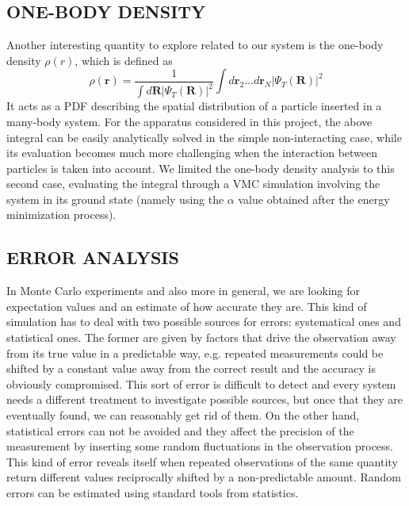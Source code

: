 \subsection{ONE-BODY DENSITY}
Another interesting quantity to explore related to our system is the one-body density $\rho(r)$, which is defined as
\begin{equation*}
    \rho(\bm{r}) = \frac{1}{\int d\bm{R} \vert \Psi_T(\bm{R}) \vert^2} \int d\bm{r}_2 \dots d\bm{r}_N \vert \Psi_T(\bm{R}) \vert^2
\end{equation*}
It acts as a PDF describing the spatial distribution of a particle inserted in a many-body system. For the apparatus considered in this project, the above integral can be easily analytically solved in the simple non-interacting case, while its evaluation becomes much more challenging when the interaction between particles is taken into account. We limited the one-body density analysis to this second case, evaluating the integral through a VMC simulation involving the system in its ground state (namely using the $\alpha$ value obtained after the energy minimization process). 



\subsection{ERROR ANALYSIS} \label{sec:error analysis}
In Monte Carlo experiments and also more in general, we are looking for expectation values and an estimate of how accurate they are. This kind of simulation has to deal with two possible sources for errors: systematical ones and statistical ones. The former are given by factors that drive the observation away from its true value in a predictable way, e.g. repeated measurements could be shifted by a constant value away from the correct result and the accuracy is obviously compromised. This sort of error is difficult to detect and every system needs a different treatment to investigate possible sources, but once that they are eventually found, we can reasonably get rid of them. On the other hand, statistical errors can not be avoided and they affect the precision of the measurement by inserting some random fluctuations in the observation process. This kind of error reveals itself when repeated observations of the same quantity return different values reciprocally shifted by a non-predictable amount. Random errors can be estimated using standard tools from statistics.

